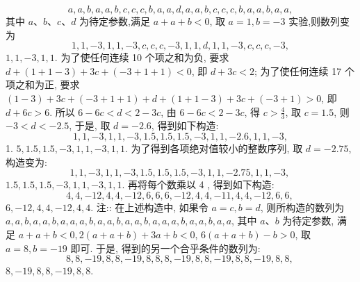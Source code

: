 $$
a, a, b, a, a, b, c, c, c, b, a, a, d, a, a, b, c, c, c, b, a, a, b, a, a,
$$
其中 $a 、 b 、 c 、 d$ 为待定参数,满足 $a+a+b<0$, 取 $a=1, b=-3$ 实验,则数列变为
$$
1,1,-3,1,1,-3, c, c, c,-3,1,1, d, 1,1,-3, c, c, c,-3,
$$
$1,1,-3,1,1$.
为了使任何连续 10 个项之和为负, 要求 $d+(1+1-3)+3 c+(-3+ 1+1)<0$, 即 $d+3 c<2$;
为了使任何连续 17 个项之和为正, 要求 $(1-3)+3 c+(-3+1+1)+d+ (1+1-3)+3 c+(-3+1)>0$, 即 $d+6 c>6$. 所以 $6-6 c<d<2-3 c$, 由 $6- 6 c<2-3 c$, 得 $c>\frac{4}{3}$, 取 $c=1.5$, 则 $-3<d<-2.5$, 于是, 取 $d=-2.6$, 得到如下构造:
$$
1,1,-3,1,1,-3,1.5,1.5,1.5,-3,1,1,-2.6,1,1,-3,
$$
1. $5,1.5,1.5,-3,1,1,-3,1,1$.
为了得到各项绝对值较小的整数序列, 取 $d=-2.75$, 构造变为:
$$
1,1,-3,1,1,-3,1.5,1.5,1.5,-3,1,1,-2.75,1,1,-3 \text {, }
$$
$1.5,1.5,1.5,-3,1,1,-3,1,1$.
再将每个数乘以 4 , 得到如下构造:
$$
4,4,-12,4,4,-12,6,6,6,-12,4,4,-11,4,4,-12,6,6 \text {, }
$$
$6,-12,4,4,-12,4,4$.
注:: 在上述构造中, 如果令 $a=c, b=d$, 则所构造的数列为 $a, a, b, a, a, b, a, a, a, b, a, a, b, a, a, b, a, a, a, b, a, a, b, a, a$, 其中 $a 、 b$ 为待定参数, 满足 $a+a+b<0,2(a+a+b)+3 a+b<0$,
$6(a+a+b)-b>0$, 取 $a=8, b=-19$ 即可.
于是, 得到的另一个合乎条件的数列为:
$$
8,8,-19,8,8,-19,8,8,8,-19,8,8,-19,8,8,-19,8,8 \text {, }
$$
$8,-19,8,8,-19,8,8$.


